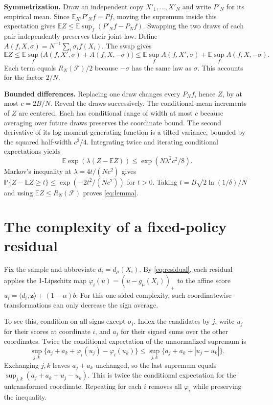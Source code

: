 \documentclass[12pt,a4paper]{article}
\newcommand{\E}{\mathbb E}
\newcommand{\Prob}{\mathbb P}
\newcommand{\F}{\mathcal F}
\newcommand{\lead}[1]{\par\smallskip\noindent\textbf{#1}\enspace}
\begin{document}
\lead{Symmetrization.}
Draw an independent copy \(X'_1,\ldots,X'_N\) and write \(P'_N\) for
its empirical mean. Since \(\E_{X'}P'_N f=P f\), moving the supremum
inside this expectation gives \(\E Z\le\E\sup_f(P'_N f-P_N f)\).
Swapping the two draws of each pair independently preserves their joint law.
Define \(A(f,X,\sigma)=N^{-1}\sum_i\sigma_i f(X_i)\). The swap gives
\[
 \E Z\le\E\sup_f\bigl(A(f,X',\sigma)+ A(f,X,-\sigma)\bigr)
 \le \E\sup_f A(f,X',\sigma)+\E\sup_f A(f,X,-\sigma).
\]
Each term equals \(R_N(\F)/2\) because \(-\sigma\) has the same law as
\(\sigma\). This accounts for the factor \(2/N\).

\lead{Bounded differences.}
Replacing one draw changes every \(P_N f\), hence \(Z\), by at most
\(c=2B/N\). Reveal the draws successively. The conditional-mean increments
of \(Z\) are centered. Each has conditional range of width at most \(c\)
because averaging over future draws preserves the coordinate bound.
The second derivative of its log moment-generating function is a tilted
variance, bounded by the squared half-width \(c^2/4\). Integrating twice
and iterating conditional expectations yields
\[
 \E\exp(\lambda(Z-\E Z))\le\exp(N\lambda^2c^2/8).
\]
Markov's inequality at \(\lambda=4t/(Nc^2)\) gives
\(\Prob\{Z-\E Z\ge t\}\le\exp(-2t^2/(Nc^2))\) for \(t>0\).
Taking \(t=B\sqrt{2\ln(1/\delta)/N}\) and using \(\E Z\le R_N(\F)\)
proves \eqref{eq:lemma}.

\newpage
\section*{The complexity of a fixed-policy residual}
Fix the sample and abbreviate \(d_i=d_\mu(X_i)\). By \eqref{eq:residual},
each residual applies the 1-Lipschitz map
\(\varphi_i(u)=(u-g_\mu(X_i))_+\) to the affine score
\(u_i=\langle d_i,\mathbf z\rangle+(1-\alpha)b\).
For this one-sided complexity, such coordinatewise transformations can
only decrease the sign average.

To see this, condition on all signs except \(\sigma_i\). Index the candidates
by \(j\), write \(u_j\) for their scores at coordinate \(i\), and \(a_j\)
for their signed sums over the other coordinates. Twice the conditional
expectation of the unnormalized supremum is
\[
 \sup_{j,k}\{a_j+a_k+\varphi_i(u_j)-\varphi_i(u_k)\}
 \le \sup_{j,k}\{a_j+a_k+|u_j-u_k|\}.
\]
Exchanging \(j,k\) leaves \(a_j+a_k\) unchanged, so the last supremum equals
\(\sup_{j,k}(a_j+a_k+u_j-u_k)\). This is twice the conditional expectation
for the untransformed coordinate. Repeating for each \(i\) removes all
\(\varphi_i\) while preserving the inequality.
\end{document}
